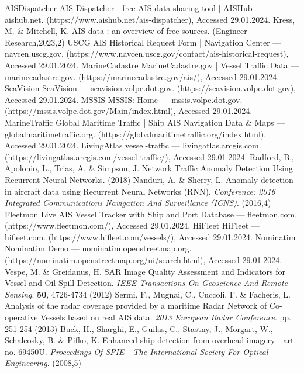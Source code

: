 AISDispatcher AIS Dispatcher - free AIS data sharing tool | AISHub — aishub.net. (https://www.aishub.net/ais-dispatcher), Accessed 29.01.2024.
Kress, M. \& Mitchell, K. AIS data : an overview of free sources. (Engineer Research,2023,2)
USCG AIS Historical Request Form | Navigation Center — navcen.uscg.gov. (https://www.navcen.uscg.gov/contact/ais-historical-request), Accessed 29.01.2024.
MarineCadastre MarineCadastre.gov | Vessel Traffic Data — marinecadastre.gov. (https://marinecadastre.gov/ais/), Accessed 29.01.2024.
SeaVision SeaVision — seavision.volpe.dot.gov. (https://seavision.volpe.dot.gov), Accessed 29.01.2024.
MSSIS MSSIS: Home — mssis.volpe.dot.gov. (https://mssis.volpe.dot.gov/Main/index.html), Accessed 29.01.2024.
MarineTraffic Global Maritime Traffic | Ship AIS Navigation Data \& Maps — globalmaritimetraffic.org. (https://globalmaritimetraffic.org/index.html), Accessed 29.01.2024.
LivingAtlas vessel-traffic — livingatlas.arcgis.com. (https://livingatlas.arcgis.com/vessel-traffic/), Accessed 29.01.2024.
Radford, B., Apolonio, L., Trias, A. \& Simpson, J. Network Traffic Anomaly Detection Using Recurrent Neural Networks. (2018)
Nanduri, A. \& Sherry, L. Anomaly detection in aircraft data using Recurrent Neural Networks (RNN). {\em Conference: 2016 Integrated Communications Navigation And Surveillance (ICNS)}. (2016,4)
Fleetmon Live AIS Vessel Tracker with Ship and Port Database — fleetmon.com. (https://www.fleetmon.com/), Accessed 29.01.2024.
HiFleet HiFleet — hifleet.com. (https://www.hifleet.com/vessels/), Accessed 29.01.2024.
Nominatim Nominatim Demo — nominatim.openstreetmap.org. (https://nominatim.openstreetmap.org/ui/search.html), Accessed 29.01.2024.
Vespe, M. \& Greidanus, H. SAR Image Quality Assessment and Indicators for Vessel and Oil Spill Detection. {\em IEEE Transactions On Geoscience And Remote Sensing}. \textbf{50}, 4726-4734 (2012)
Sermi, F., Mugnai, C., Cuccoli, F. \& Facheris, L. Analysis of the radar coverage provided by a maritime Radar Network of Co-operative Vessels based on real AIS data. {\em 2013 European Radar Conference}. pp. 251-254 (2013)
Buck, H., Sharghi, E., Guilas, C., Stastny, J., Morgart, W., Schalcosky, B. \& Pifko, K. Enhanced ship detection from overhead imagery - art. no. 69450U. {\em Proceedings Of SPIE - The International Society For Optical Engineering}. (2008,5)
